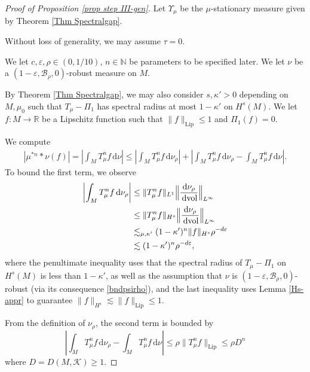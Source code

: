 \documentclass[11pt, leqno, fleqn]{amsart}
\def\eps{\varepsilon}
\newcommand{\norm}[1]{\| #1\|}
\def\cB{          \mathcal B}
\def \R{{\mathbb R}}
\def \N{{\mathbb N}}
\newcommand{\abse}[1]{\left\lvert#1\right\rvert}
\newcommand{\normBig}[1]{\Bigl\lVert#1\Bigr\rVert}
\newcommand{\dd}{\,\mathrm{d}}
\DeclareMathOperator{\Lip}{Lip}
\newcommand{\cK}{{\mathcal K}}
\theoremstyle{definition}
\theoremstyle{definition}
\def \vol{  {\rm vol} }
\begin{document}
	\begin{proof}[Proof of Proposition \ref{prop step III-gen}] 


Let $\Upsilon_{\mu}$ be the $\mu$-stationary measure given by Theorem \ref{Thm Spectralgap}.

	Without loss of generality, we may assume $\tau=0$. 
	
	 
	
	We let $c, \eps, \rho\in (0, 1/10)$, $n\in \N$ be parameters to be specified later. We let $\nu$ be a $(1-\eps, \cB_{\rho}, 0)$-robust measure on $M$.


  By Theorem \ref{Thm Spectralgap}, we may also consider $s, \kappa'>0$ depending on $M, \mu_{0}$ such that $T_{\mu} -\Pi_{1}$ has spectral radius at most $1-  \kappa'$ on $H^{s}(M)$. We let $f : M\rightarrow \R$ be  a Lipschitz function such that $\|f\|_{\Lip}\leq 1$ and $\Pi_{1}(f)=0$.  
	
We compute 
\begin{align*}
| \mu^{*n}*\nu(f)|= \abse{\int_{M} T_\mu^n f \dd \nu} 
\leq \abse{\int_{M} T_{\mu}^n f \dd \nu_\rho}  + \abse{\int_{M} T_{\mu}^n f \dd \nu_\rho - \int_{M} T_{\mu}^n f \dd \nu}.
\end{align*}
To bound the first term, we observe
\begin{align*}
\abse{\int_{M} T_\mu^n f \dd \nu_\rho}  
& \leq \norm{T_\mu^n f }_{L^1} \normBig{ \frac{\mathrm{d}\nu_\rho}{\dd\vol}}_{L^\infty}\\
&\leq \norm{T_\mu^n f }_{H^s} \normBig{ \frac{\mathrm{d}\nu_\rho}{\dd\vol}}_{L^\infty}\\
&\lesssim_{\mu, \kappa'}  (1-\kappa')^n \|f \|_{H^s}\rho^{-d \eps}\\
&\lesssim   (1-\kappa')^n \rho^{- d \eps},
\end{align*}
where the penultimate inequality uses that the spectral radius of $T_{\mu}-\Pi_{1}$ on $H^s(M)$ is less than $1-  \kappa'$,  as well as   the assumption that $\nu$ is $(1-\eps, \cB_{\rho}, 0)$-robust (via its consequence \eqref{bndpsirho}), and the last inequality uses Lemma \ref{Hs-appr} to guarantee $\|f \|_{H^s} \lesssim \|f \|_{\Lip}\leq1$.  

From the definition of $\nu_{\rho}$, the second term is bounded by
\begin{equation*}
\abse{\int_{M} T_\mu^n f \dd \nu_\rho - \int_{M} T_\mu^n f \dd \nu} 
\leq   \rho \|T_\mu^n f\|_{\Lip} \leq  \rho D^n
\end{equation*}
where  $D=D(M,\cK)\geq1$.  


\end{proof}
\end{document}
